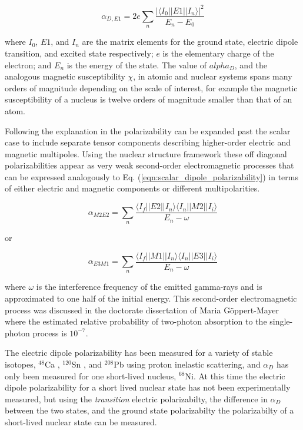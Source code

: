 \documentclass[cnatzke_thesis_proposal.tex]{subfiles}
\begin{document}
\begin{equation} \label{eqn:scalar_dipole_polarizability}
    \alpha_{D,E1} = 2 e \sum_n \frac{|\langle I_0 || E1 || I_n \rangle |^2}{E_n - E_0}
\end{equation}

where $I_0$, $E1$, and $I_n$ are the matrix elements for the ground state, electric dipole transition, and excited state respectively; $e$ is the elementary charge of the electron; and $E_n$ is the energy of the state. 
The value of $alpha_D$, and the analogous magnetic susceptibility $\chi$, in atomic and nuclear systems spans many orders of magnitude depending on the scale of interest, for example the magnetic susceptibility of a nucleus is twelve orders of magnitude smaller than that of an atom. \cite{knupfer_scaling_1985}

Following the explanation in \cite{soderstrom_electromagnetic_2020} the polarizability can be expanded past the scalar case to include separate tensor components describing higher-order electric and magnetic multipoles. Using the nuclear structure framework these off diagonal polarizabilities appear as very weak second-order electromagnetic processes that can be expressed analogously to Eq. (\ref{eqn:scalar_dipole_polarizability}) in terms of either electric and magnetic components or different multipolarities. 

\begin{equation} \label{eqn:m2e2_dipole_polarizability}
    \alpha_{M2E2} = \sum_n \frac{\langle I_f || E2 || I_n \rangle \langle I_n || M2 || I_i \rangle}{E_n - \omega}
\end{equation}

or 

\begin{equation} \label{eqn:m2e2_dipole_polarizability}
    \alpha_{E3M1} = \sum_n \frac{\langle I_f || M1 || I_n \rangle \langle I_n || E3 || I_i \rangle}{E_n - \omega}
\end{equation}

where $\omega$ is the interference frequency of the emitted gamma-rays and is approximated to one half of the initial energy. 
This second-order electromagnetic process was discussed in the doctorate dissertation of Maria G\"oppert-Mayer \cite{goppert-mayer_uber_1931} where the estimated relative probability of two-photon absorption to the single-photon process is $10^{-7}$. 

The electric dipole polarizability has been measured for a variety of stable isotopes, $^{48}$Ca \cite{Birkhan2017}, $^{120}$Sn \cite{Hashimoto2015}, and $^{208}$Pb \cite{Tamii2011} using proton inelastic scattering, and $\alpha_D$ has only been measured for one short-lived nucleus, $^{68}$Ni. \cite{Rossi2013}
At this time the electric dipole polarizability for a short lived nuclear state has not been experimentally measured, but using the \textit{transition} electric polarizabilty, the difference in $\alpha_D$ between the two states, and the ground state polarizabilty the polarizabilty of a short-lived nuclear state can be measured.
\end{document}
